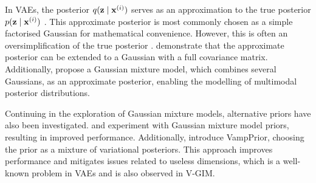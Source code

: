 	In VAEs, the posterior $q (\mathbf{z} \mid \mathbf{x}^{(i)})$ serves as an approximation to the true posterior $p (\mathbf{z} \mid \mathbf{x}^{(i)})$ \citep{odaiboTutorialDerivingStandard2019}. This approximate posterior is most commonly chosen as a simple factorised Gaussian for mathematical convenience. However, this is often an oversimplification of the true posterior \citep{nalisnickApproximateInferenceDeep2016a}. \cite{kingmaIntroductionVariationalAutoencoders2019} demonstrate that the approximate posterior can be extended to a Gaussian with a full covariance matrix. Additionally, \cite{nalisnickApproximateInferenceDeep2016a} propose a Gaussian mixture model, which combines several Gaussians, as an approximate posterior, enabling the modelling of multimodal posterior distributions.
	
	Continuing in the exploration of Gaussian mixture models, alternative priors have also been investigated. \cite{guoVariationalAutoencoderOptimizing2020} and \cite{leeMetaGMVAEMixtureGaussian2021} experiment with Gaussian mixture model priors, resulting in improved performance. Additionally, \cite{tomczakVAEVampPrior2018} introduce VampPrior, choosing the prior as a mixture of variational posteriors. This approach improves performance and mitigates issues related to useless dimensions, which is a well-known problem in VAEs and is also observed in V-GIM.
	












%	
%	
%	


